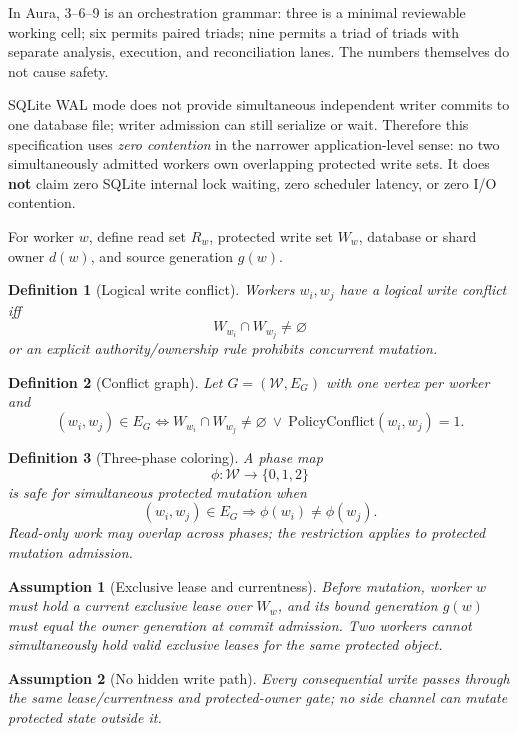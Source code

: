 \documentclass[11pt]{article}
\newtheorem{definition}{Definition}
\newtheorem{assumption}{Assumption}
\begin{document}
In Aura, 3--6--9 is an orchestration grammar: three is a minimal reviewable
working cell; six permits paired triads; nine permits a triad of triads with
separate analysis, execution, and reconciliation lanes.  The numbers themselves
do not cause safety.

SQLite WAL mode does not provide simultaneous independent writer commits to one
database file; writer admission can still serialize or wait.  Therefore this
specification uses \emph{zero contention} in the narrower application-level
sense: no two simultaneously admitted workers own overlapping protected write
sets.  It does \textbf{not} claim zero SQLite internal lock waiting, zero
scheduler latency, or zero I/O contention.

For worker \(w\), define read set \(R_w\), protected write set \(W_w\), database
or shard owner \(d(w)\), and source generation \(g(w)\).

\begin{definition}[Logical write conflict]
Workers \(w_i,w_j\) have a logical write conflict iff
\[
W_{w_i}\cap W_{w_j}\neq\varnothing
\]
or an explicit authority/ownership rule prohibits concurrent mutation.
\end{definition}

\begin{definition}[Conflict graph]
Let \(G=(\mathcal{W},E_G)\) with one vertex per worker and
\[
(w_i,w_j)\in E_G
\iff
W_{w_i}\cap W_{w_j}\neq\varnothing
\ \lor\
\mathrm{PolicyConflict}(w_i,w_j)=1.
\]
\end{definition}

\begin{definition}[Three-phase coloring]
A phase map
\[
\phi:\mathcal{W}\rightarrow\{0,1,2\}
\]
is safe for simultaneous protected mutation when
\[
(w_i,w_j)\in E_G\Rightarrow\phi(w_i)\neq\phi(w_j).
\]
Read-only work may overlap across phases; the restriction applies to protected
mutation admission.
\end{definition}

\begin{assumption}[Exclusive lease and currentness]
Before mutation, worker \(w\) must hold a current exclusive lease over \(W_w\),
and its bound generation \(g(w)\) must equal the owner generation at commit
admission.  Two workers cannot simultaneously hold valid exclusive leases for
the same protected object.
\end{assumption}

\begin{assumption}[No hidden write path]
Every consequential write passes through the same lease/currentness and
protected-owner gate; no side channel can mutate protected state outside it.
\end{assumption}
\end{document}
